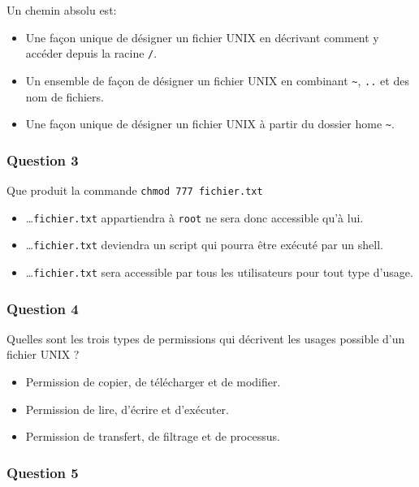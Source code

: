 \documentclass[
]{article}
\providecommand{\tightlist}{%
  \setlength{\itemsep}{0pt}\setlength{\parskip}{0pt}}
\begin{document}
Un chemin absolu est:

\begin{itemize}
\tightlist
\item
  Une façon unique de désigner un fichier UNIX en décrivant comment y
  accéder depuis la racine \texttt{/}.
\item
  Un ensemble de façon de désigner un fichier UNIX en combinant
  \texttt{\textasciitilde{}}, \texttt{..} et des nom de fichiers.
\item
  Une façon unique de désigner un fichier UNIX à partir du dossier home
  \texttt{\textasciitilde{}}.
\end{itemize}

\hypertarget{question-3}{%
\subsubsection{Question 3}\label{question-3}}

Que produit la commande \texttt{chmod\ 777\ fichier.txt}

\begin{itemize}
\tightlist
\item
  \ldots{}\texttt{fichier.txt} appartiendra à \texttt{root} ne sera donc
  accessible qu'à lui.
\item
  \ldots{}\texttt{fichier.txt} deviendra un script qui pourra être
  exécuté par un shell.
\item
  \ldots{}\texttt{fichier.txt} sera accessible par tous les utilisateurs
  pour tout type d'usage.
\end{itemize}

\hypertarget{question-4}{%
\subsubsection{Question 4}\label{question-4}}

Quelles sont les trois types de permissions qui décrivent les usages
possible d'un fichier UNIX ?

\begin{itemize}
\tightlist
\item
  Permission de copier, de télécharger et de modifier.
\item
  Permission de lire, d'écrire et d'exécuter.
\item
  Permission de transfert, de filtrage et de processus.
\end{itemize}

\hypertarget{question-5}{%
\subsubsection{Question 5}\label{question-5}}
\end{document}
